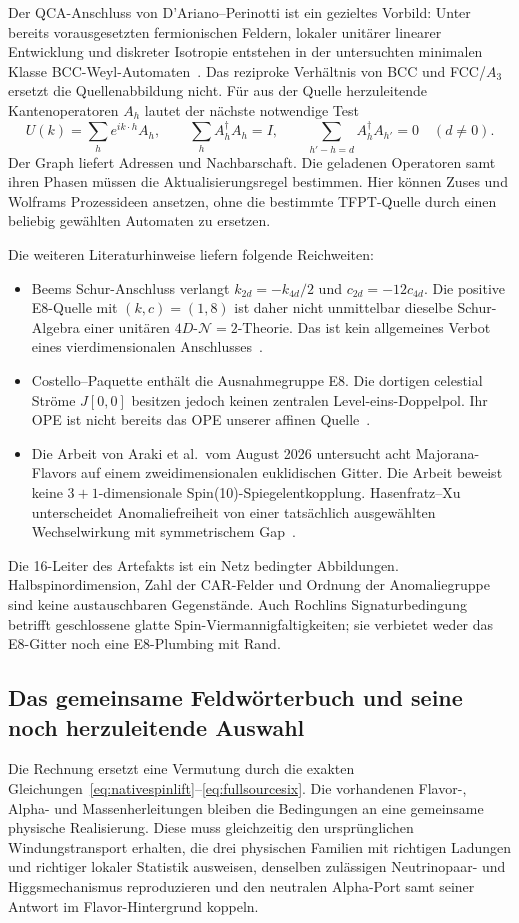 Der QCA-Anschluss von D'Ariano--Perinotti ist ein gezieltes Vorbild: Unter bereits vorausgesetzten fermionischen Feldern, lokaler unitärer linearer Entwicklung und diskreter Isotropie entstehen in der untersuchten minimalen Klasse BCC-Weyl-Automaten~\cite{darianojo}. Das reziproke Verhältnis von BCC und FCC/$A_3$ ersetzt die Quellenabbildung nicht. Für aus der Quelle herzuleitende Kantenoperatoren $A_h$ lautet der nächste notwendige Test
\begin{equation}
U(k)=\sum_h e^{ik\cdot h}A_h,\qquad
\sum_h A_h^\dagger A_h=I,\qquad
\sum_{h'-h=d}A_h^\dagger A_{h'}=0\quad(d\ne0).
\end{equation}
Der Graph liefert Adressen und Nachbarschaft. Die geladenen Operatoren samt ihren Phasen müssen die Aktualisierungsregel bestimmen. Hier können Zuses und Wolframs Prozessideen ansetzen, ohne die bestimmte TFPT-Quelle durch einen beliebig gewählten Automaten zu ersetzen.

Die weiteren Literaturhinweise liefern folgende Reichweiten:
\begin{itemize}
\item Beems Schur-Anschluss verlangt $k_{2d}=-k_{4d}/2$ und $c_{2d}=-12c_{4d}$. Die positive E8-Quelle mit $(k,c)=(1,8)$ ist daher nicht unmittelbar dieselbe Schur-Algebra einer unitären $4D$-$\mathcal N=2$-Theorie. Das ist kein allgemeines Verbot eines vierdimensionalen Anschlusses~\cite{beemchiral}.
\item Costello--Paquette enthält die Ausnahmegruppe E8. Die dortigen celestial Ströme $J[0,0]$ besitzen jedoch keinen zentralen Level-eins-Doppelpol. Ihr OPE ist nicht bereits das OPE unserer affinen Quelle~\cite{costellopaquette}.
\item Die Arbeit von Araki et al.\ vom August 2026 untersucht acht Majorana-Flavors auf einem zweidimensionalen euklidischen Gitter. Die Arbeit beweist keine $3+1$-dimensionale Spin(10)-Spiegelentkopplung. Hasenfratz--Xu unterscheidet Anomaliefreiheit von einer tatsächlich ausgewählten Wechselwirkung mit symmetrischem Gap~\cite{arakidomain,hasenfratzguide}.
\end{itemize}
Die 16-Leiter des Artefakts ist ein Netz bedingter Abbildungen. Halbspinordimension, Zahl der CAR-Felder und Ordnung der Anomaliegruppe sind keine austauschbaren Gegenstände. Auch Rochlins Signaturbedingung betrifft geschlossene glatte Spin-Viermannigfaltigkeiten; sie verbietet weder das E8-Gitter noch eine E8-Plumbing mit Rand.

\subsection{Das gemeinsame Feldwörterbuch und seine noch herzuleitende Auswahl}
Die Rechnung ersetzt eine Vermutung durch die exakten Gleichungen~\eqref{eq:nativespinlift}--\eqref{eq:fullsourcesix}. Die vorhandenen Flavor-, Alpha- und Massenherleitungen bleiben die Bedingungen an eine gemeinsame physische Realisierung. Diese muss gleichzeitig den ursprünglichen Windungstransport erhalten, die drei physischen Familien mit richtigen Ladungen und richtiger lokaler Statistik ausweisen, denselben zulässigen Neutrinopaar- und Higgsmechanismus reproduzieren und den neutralen Alpha-Port samt seiner Antwort im Flavor-Hintergrund koppeln.

